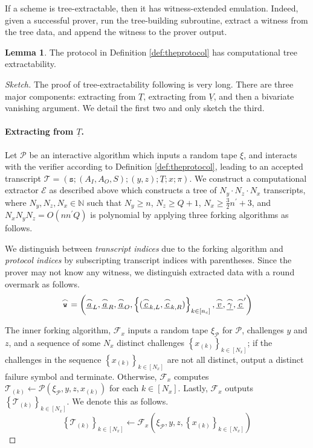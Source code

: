 \documentclass{article}
\theoremstyle{definition}
\newtheorem{lemma}[theorem]{Lemma}
\begin{document}
If a scheme is tree-extractable, then it has witness-extended emulation. Indeed, given a successful prover, run the tree-building subroutine, extract a witness from the tree data, and append the witness to the prover output.



\begin{lemma}
The protocol in Definition \ref{def:theprotocol} has computational tree extractability.
\end{lemma}
\begin{proof}[Sketch]
The proof of tree-extractability following is very long. There are three major components: extracting from $\underline{T}$, extracting from $\underline{V}$, and then a bivariate vanishing argument. We detail the first two and only sketch the third.

\paragraph{Extracting from $\underline{T}$.} Let $\mathcal{P}$ be an interactive algorithm which inputs a random tape $\xi$, and interacts with the verifier according to Definition \ref{def:theprotocol}, leading to an accepted transcript $\mathcal{T} = \left(\texttt{s}; (A_I, A_O, S); (y, z); \underline{T}; x; \pi\right)$. 
We construct a computational extractor $\mathcal{E}$ as described above which constructs a tree of $N_y \cdot N_z \cdot N_x$ transcripts, where $N_y, N_z, N_x \in \mathbb{N}$ such that $N_y \geq n$, $N_z \geq Q+1$,  $N_x \geq \frac{3}{2}n^\prime+3$, and $N_xN_yN_z = O(nn^\prime Q)$ is polynomial by applying three forking algorithms as follows.

We distinguish between \textit{transcript indices} due to the forking algorithm \cite{bellare2006multi} and \textit{protocol indices} by subscripting transcript indices with parentheses. Since the prover may not know any witness, we distinguish extracted data with a round overmark as follows. $$\overset{\LARGE \frown}{\small{\texttt{w}}} = \left(\underline{\overset{\LARGE \frown}{\small{a}}}_L, \underline{\overset{\LARGE \frown}{\small{a}}}_R, \underline{\overset{\LARGE \frown}{\small{a}}}_O, \left\{(\underline{\overset{\LARGE \frown}{\small{c}}}_{k,L}, \underline{\overset{\LARGE \frown}{\small{c}}}_{k,R})\right\}_{k \in [n_c]}, \underline{\overset{\LARGE \frown}{\small{v}}}, \underline{\overset{\LARGE \frown}{\small{\gamma}}},  \underline{\overset{\LARGE \frown}{\small{c}}}^\prime\right)$$


The inner forking algorithm, $\mathcal{F}_x$  inputs a random tape $\xi_{\mathcal{P}}$ for $\mathcal{P}$, challenges $y$ and $z$, and a sequence of some $N_x$ distinct challenges $\left\{x_{(k)}\right\}_{k \in [N_x]}$; if the challenges in the sequence $\left\{x_{(k)}\right\}_{k \in [N_x]}$ are not all distinct, output a distinct failure symbol and terminate. Otherwise, $\mathcal{F}_x$ computes $\mathcal{T}_{(k)} \leftarrow \mathcal{P}(\xi_{\mathcal{P}}, y, z, x_{(k)})$ for each $k \in [N_x]$. Lastly, $\mathcal{F}_x$ outputs $\left\{\mathcal{T}_{(k)}\right\}_{k \in [N_x]}$. We denote this as follows.
$$\left\{\mathcal{T}_{(k)}\right\}_{k \in [N_x]} \leftarrow \mathcal{F}_x\left(\xi_{\mathcal{P}}, y, z, \left\{x_{(k)}\right\}_{k \in [N_x]}\right)$$


\end{proof}
\end{document}
